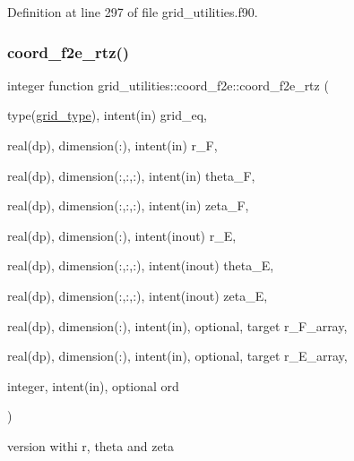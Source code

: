 Definition at line 297 of file grid\+\_\+utilities.\+f90.

\mbox{\label{interfacegrid__utilities_1_1coord__f2e_a3ab9822d623e86babe9eb47f99c9434e}} 
\subsubsection{\texorpdfstring{coord\+\_\+f2e\+\_\+rtz()}{coord\_f2e\_rtz()}}
{\footnotesize\ttfamily integer function grid\+\_\+utilities\+::coord\+\_\+f2e\+::coord\+\_\+f2e\+\_\+rtz (\begin{DoxyParamCaption}\item[{type(\hyperlink{structgrid__vars_1_1grid__type}{grid\+\_\+type}), intent(in)}]{grid\+\_\+eq,  }\item[{real(dp), dimension(\+:), intent(in)}]{r\+\_\+F,  }\item[{real(dp), dimension(\+:,\+:,\+:), intent(in)}]{theta\+\_\+F,  }\item[{real(dp), dimension(\+:,\+:,\+:), intent(in)}]{zeta\+\_\+F,  }\item[{real(dp), dimension(\+:), intent(inout)}]{r\+\_\+E,  }\item[{real(dp), dimension(\+:,\+:,\+:), intent(inout)}]{theta\+\_\+E,  }\item[{real(dp), dimension(\+:,\+:,\+:), intent(inout)}]{zeta\+\_\+E,  }\item[{real(dp), dimension(\+:), intent(in), optional, target}]{r\+\_\+\+F\+\_\+array,  }\item[{real(dp), dimension(\+:), intent(in), optional, target}]{r\+\_\+\+E\+\_\+array,  }\item[{integer, intent(in), optional}]{ord }\end{DoxyParamCaption})}



version withi r, theta and zeta 


